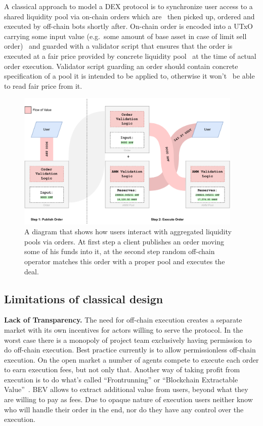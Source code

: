 \documentclass[11pt]{article}
\begin{document}
\begin{sloppypar}
        A classical approach to model a DEX protocol is to synchronize user access to a shared liquidity pool via on-chain orders which are \
        then picked up, ordered and executed by off-chain bots shortly after.
        On-chain order is encoded into a UTxO carrying some input value (e.g.\ some amount of base asset in case of limit sell order) \
        and guarded with a validator script that ensures that the order is executed at a fair price provided by concrete liquidity pool \
        at the time of actual order execution.
        Validator script guarding an order should contain concrete specification of a pool it is intended to be applied to, otherwise it won't \
        be able to read fair price from it.

        \begin{figure}[h]
            \centering
            \includegraphics[width=0.96\textwidth]{pool+order}
            \caption{A diagram that shows how users interact with aggregated liquidity pools via orders.
            At first step a client publishes an order moving some of his funds into it, at the second step
            random off-chain operator matches this order with a proper pool and executes the deal.}
            \label{fig:figure2}
        \end{figure}

        \subsection{Limitations of classical design}\label{subsec:limitations-of-classical-design}
        \textbf{Lack of Transparency.} The need for off-chain execution creates a separate market with its own incentives for actors willing to serve the protocol.
        In the worst case there is a monopoly of project team exclusively having permission to do off-chain execution.
        Best practice currently is to allow permissionless off-chain execution.
        On the open market a number of agents compete to execute each order to earn execution fees, but not only that.
        Another way of taking profit from execution is to do what's called \enquote{Frontrunning} or \enquote{Blockchain Extractable Value}~\cite{bartoletti2023theoretical}.
        BEV allows to extract additional value from users, beyond what they are willing to pay as fees.
        Due to opaque nature of execution users neither know who will handle their order in the end, nor do they have any control over the execution.


\end{sloppypar}
\end{document}
